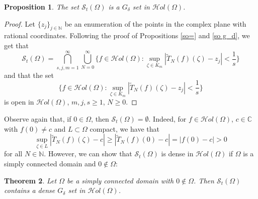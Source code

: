 \documentclass[11pt,twoside,a4paper]{article}
\newtheorem{theorem}{Theorem}[section]
\newtheorem{proposition}[theorem]{Proposition}
\theoremstyle{remark}
\def\d{\delta}
\newcommand{\holo}{{\mathcal Hol}(\Omega)}
\newcommand{\sto}{\mathcal{S}_t(\Omega)}
\begin{document}
\begin{proposition}
  The set $\sto$ is a $G_\d$ set in $\holo$.
\end{proposition}

\begin{proof}
  Let $\{z_j\}_{j \in \mathbb{N}}$ be an enumeration of the points in the complex plane with rational coordinates. Following the proof of Propositions \ref{so=} and \ref{so g_d}, we get that
  \begin{equation*}
    \sto = \bigcap\limits_{s,j,m=1}^{\infty}\bigcup\limits_{N=0}^{\infty}\big\{ f \in \holo: \sup\limits_{\zeta \in K_m}|\widetilde{T}_{N} (f)(\zeta)-z_j| < \frac{1}{s}\big\}
  \end{equation*} and that the set
  \begin{equation*}
    \big\{ f \in \holo: \sup\limits_{\zeta \in K_m}|\widetilde{T}_{N} (f)(\zeta)-z_j| < \frac{1}{s}\big\}
  \end{equation*}
  is open in $\holo$, $m,j,s \geq 1$, $N \geq 0$.
\end{proof}
Observe again that, if $0 \in \Omega$, then $\sto = \emptyset$. Indeed, for $f \in \holo$, $c \in \mathbb{C}$ with $f(0) \neq c$ and $L \subset \Omega$ compact, we have that
\begin{equation*}
  \sup\limits_{\zeta \in L}|\widetilde{T}_N(f)(\zeta)-c| \geq |\widetilde{T}_N(f)(0)-c|= |f(0)-c| >0
\end{equation*}
for all $N \in \mathbb{N}$. However, we can show that $\sto$ is dense in $\holo$ if $\Omega $ is a simply connected domain and $0 \notin \Omega$:
\begin{theorem}
  \label{sto dense gd} Let $\Omega $ be a simply connected domain with $0 \notin \Omega$. Then $\sto$ contains a dense $G_\d$ set in $\holo$.
\end{theorem}
\end{document}
